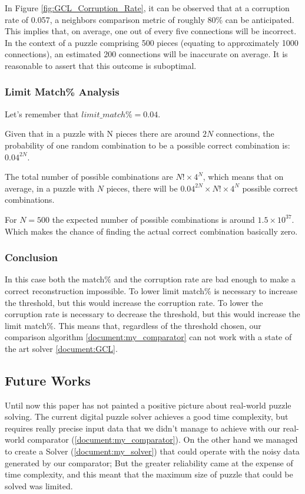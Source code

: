 \documentclass{article}
\begin{document}
In Figure \cref{fig:GCL_Corruption_Rate}, it can be observed that at a corruption rate of 0.057,
a neighbors comparison metric of roughly 80\% can be anticipated.
This implies that, on average, one out of every five connections will be incorrect.
In the context of a puzzle comprising 500 pieces (equating to approximately 1000 connections),
an estimated 200 connections will be inaccurate on average.
It is reasonable to assert that this outcome is suboptimal.

\subsubsection{Limit Match\% Analysis}
Let's remember that \(limit\_match\% = 0.04\).

Given that in a puzzle with N pieces there are around \(2N \) connections,
the probability of one random combination to be a
possible correct combination is: \(0.04^{2N}\).

The total number of possible combinations are \(N! \times 4^N\),
which means that on average, in a puzzle with \(N\) pieces,
there will be \(0.04^{2N} \times N! \times 4^N \)
possible correct combinations.

For \( N = 500 \) the expected number of possible combinations is around \( 1.5 \times 10^{37} \).
Which makes the chance of finding the actual correct combination basically zero.
\subsubsection{Conclusion}
In this case both the match\% and the corruption rate are bad enough to make a correct reconstruction impossible.
To lower limit match\% is necessary to increase the threshold, but this would increase the corruption rate.
To lower the corruption rate is necessary to decrease the threshold, but this would increase the limit match\%.
This means that, regardless of the threshold chosen, our comparison algorithm \cref{document:my_comparator}
can not work with a state of the art solver \cref{document:GCL}.


\subsection{Future Works}

Until now this paper has not painted a positive picture about real-world
puzzle solving. The current digital puzzle solver achieves a good time
complexity, but requires really precise input data that we didn't manage
to achieve with our real-world comparator (\cref{document:my_comparator}).
On the other hand we managed to create a Solver (\cref{document:my_solver})
that could operate with the noisy data generated by our comparator;
But the greater reliability came at the expense of time complexity,
and this meant that the maximum size of puzzle that could be solved was limited.
\end{document}
